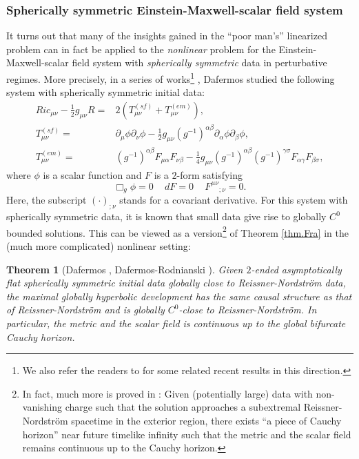 \documentclass[12 pt, reqno]{amsart}
\newtheorem{theorem}{Theorem}[section]
\theoremstyle{definition}
\theoremstyle{remark}
\numberwithin{equation}{section}
\newcommand{\rd}{\partial}
\newcommand{\0}{\emptyset}
\newcommand{\alp}{\alpha}
\newcommand{\bt}{\beta}
\newcommand{\f}{\frac}
\begin{document}
\subsubsection{Spherically symmetric Einstein-Maxwell-scalar field system}\label{SSEMSF}

It turns out that many of the insights gained in the ``poor man's'' linearized problem can in fact be applied to the \emph{nonlinear} problem for the Einstein-Maxwell-scalar field system with \emph{spherically symmetric} data in perturbative regimes. 
More precisely, in a series of works\footnote{We also refer the readers to \cite{KomThe, CGNS2, CGNS3} for some related recent results in this direction.} \cite{D1,D2,D3}, Dafermos studied the following system with spherically symmetric initial data:
\begin{equation*}
\begin{split}
Ric_{\mu\nu}-\f12 g_{\mu\nu} R=&2(T^{(sf)}_{\mu\nu}+T^{(em)}_{\mu\nu}),\\
T^{(sf)}_{\mu\nu}=&\rd_\mu\phi\rd_\nu\phi-\f 12 g_{\mu\nu} (g^{-1})^{\alp\beta}\rd_\alp\phi\rd_{\beta}\phi,\\
T^{(em)}_{\mu\nu}=&(g^{-1})^{\alp\bt}F_{\mu\alp}F_{\nu\bt}-\f 14 g_{\mu\nu}(g^{-1})^{\alp\bt}(g^{-1})^{\gamma\sigma}F_{\alp\gamma}F_{\bt\sigma},
\end{split}
\end{equation*}
where $\phi$ is a scalar function and $F$ is a $2$-form satisfying
$$\Box_g\phi=0\,\quad dF=0\,\quad F^{\mu\nu}{ }{ }_{;\nu}=0.$$
Here, the subscript $(\cdot)_{;\nu}$ stands for a covariant derivative. For this system with spherically symmetric data, it is known that small data give rise to globally $C^0$ bounded solutions. This can be viewed as a version\footnote{In fact, much more is proved in \cite{D2, DRPL}: Given (potentially large) data with non-vanishing charge such that the solution approaches a subextremal Reissner-Nordstr\"om spacetime in the exterior region, there exists ``a piece of Cauchy horizon'' near future timelike infinity such that the metric and the scalar field remains continuous up to the Cauchy horizon.} of Theorem \ref{thm.Fra} in the (much more complicated) nonlinear setting:
\begin{theorem}[Dafermos \cite{D2,D3}, Dafermos-Rodnianski \cite{DRPL}]
Given $2$-ended asymptotically flat spherically symmetric initial data globally close to Reissner-Nordstr\"om data, the maximal globally hyperbolic development has the same causal structure as that of Reissner-Nordstr\"om and is globally $C^0$-close to Reissner-Nordstr\"om. In particular, the metric and the scalar field is continuous up to the global bifurcate Cauchy horizon.
\end{theorem}
\end{document}
